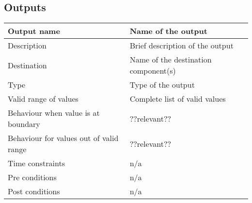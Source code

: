 \subsection{Outputs}

\begin{longtable}{p{}p{}}
\toprule
Output name			& Name of the output \\
\midrule
Description			& Brief description of the output \\
\midrule
Destination			& Name of the destination component(s) \\ 
\midrule
Type				& Type of the output \\
\midrule
Valid range of values	& Complete list of valid values \\
\midrule
Behaviour when value is at boundary	& ??relevant?? \\
\midrule
Behaviour for values out of valid range	& ??relevant?? \\
\midrule
Time constraints	& n/a \\
\midrule
Pre conditions 		& n/a \\
\midrule
Post conditions 	& n/a \\
\bottomrule
\end{longtable}
